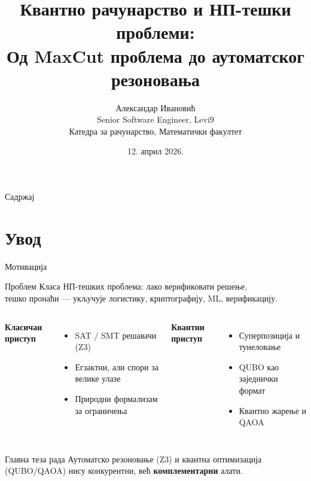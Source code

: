 \documentclass[aspectratio=169]{beamer}
\title[Квантно рачунарство и НП-тешки проблеми]{%
  Квантно рачунарство и НП-тешки проблеми:\\
  \small Од MaxCut проблема до аутоматског резоновања}
\author[А. Ивановић]{Александар Ивановић\\
  \small Senior Software Engineer, Levi9\\
  \small Катедра за рачунарство, Математички факултет}
\institute[МФ, Универзитет у Београду]{Математички факултет, Универзитет у Београду}
\date{12. април 2026.}
\begin{document}

\begin{frame}
  \titlepage
\end{frame}

\begin{frame}{Садржај}
  \tableofcontents
\end{frame}

\section{Увод}

\begin{frame}{Мотивација}
  \begin{block}{Проблем}
    Класа НП-тешких проблема: лако верификовати решење,\\
    тешко пронаћи — укључује логистику, криптографију, ML, верификацију.
  \end{block}

  \bigskip
  \begin{columns}[T]
      \textbf{Класичан приступ}
      \begin{itemize}
        \item SAT / SMT решавачи (Z3)
        \item Егзактни, али спори за велике улазе
        \item Природни формализам за ограничења
      \end{itemize}
      \textbf{Квантни приступ}
      \begin{itemize}
        \item Суперпозиција и тунеловање
        \item QUBO као заједнички формат
        \item Квантно жарење и QAOA
      \end{itemize}
  \end{columns}

  \bigskip
  \begin{alertblock}{Главна теза рада}
    Аутоматско резоновање (Z3) и квантна оптимизација (QUBO/QAOA)
    нису конкурентни, већ \textbf{комплементарни} алати.
  \end{alertblock}
\end{frame}
\end{document}
